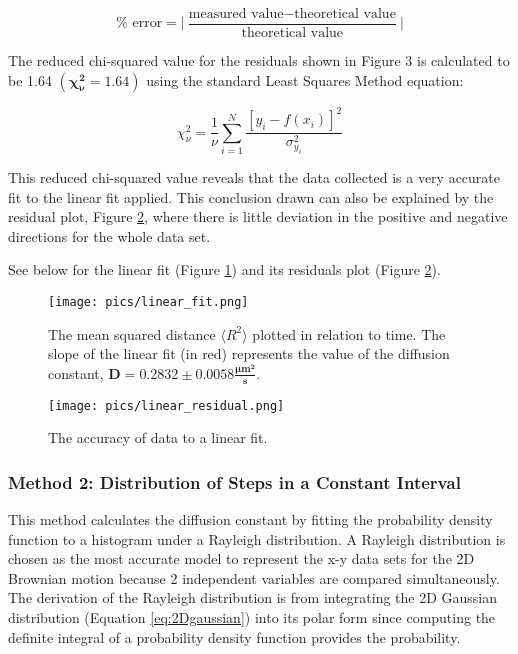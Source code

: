 \documentclass[12pt, letterpaper, twoside]{article}
\begin{document}
\begin{equation*}
    \%\text{ error} = \Big|\frac{\text{measured value} - \text{theoretical value}}{\text{theoretical value}}\Big|
\end{equation*}

The reduced chi-squared value for the residuals shown in Figure 3 is calculated to be 1.64 $\bm{(\chi_{\nu}^2 = 1.64)}$ using the standard Least Squares Method equation: 

\begin{equation}
    \chi_{\nu}^2 = \frac{1}{\nu}\sum_{i=1}^N\frac{[y_i - f(x_i)]^2}{\sigma_{y_i}^2} \label{chisq} 
\end{equation}

This reduced chi-squared value reveals that the data collected is a very accurate fit to the linear fit applied. This conclusion drawn can also be explained by the residual plot, Figure \ref{fig:linear_fit_residuals}, where there is little deviation in the positive and negative directions for the whole data set.

See below for the linear fit (Figure \ref{fig:linear_fit}) and its residuals plot (Figure \ref{fig:linear_fit_residuals}).

\begin{figure}[!ht]
    \centering
    \texttt{[image: pics/linear\_fit.png]}
    \caption{The mean squared distance $\langle R^2\rangle$ plotted in relation to time. The slope of the linear fit (in red) represents the value of the diffusion constant, $\bm{D = 0.2832 \pm  0.0058 \frac{\mu m^2}{s}}$.}
    \label{fig:linear_fit}
\end{figure}

\begin{figure}[!ht]
    \centering
    \texttt{[image: pics/linear\_residual.png]}
    \caption{The accuracy of data to a linear fit. }
    \label{fig:linear_fit_residuals}
\end{figure}

\vfill\pagebreak

\subsubsection*{Method 2: Distribution of Steps in a Constant Interval}

This method calculates the diffusion constant by fitting the probability density function to a histogram under a Rayleigh distribution. A Rayleigh distribution is chosen as the most accurate model to represent the x-y data sets for the 2D Brownian motion because 2 independent variables are compared simultaneously. The derivation of the Rayleigh distribution is from integrating the 2D Gaussian distribution (Equation \ref{eq:2Dgaussian}) into its polar form since computing the definite integral of a probability density function provides the probability.
\end{document}
